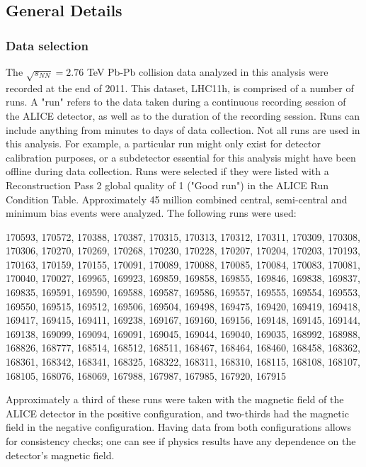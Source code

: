 \subsection{General Details}
\label{sec:GeneralDetails}

\subsubsection{Data selection}
\label{sec:DataSelection}

The $\sqrt{s_{NN}}=2.76$ TeV Pb-Pb collision data analyzed in this analysis were recorded at the end of 2011.
This dataset, LHC11h, is comprised of a number of runs.
A "run" refers to the data taken during a continuous recording session of the ALICE detector, as well as to the duration of the recording session.
Runs can include anything from minutes to days of data collection.
Not all runs are used in this analysis.
For example, a particular run might only exist for detector calibration purposes, or a subdetector essential for this analysis might have been offline during data collection.
Runs were selected if they were listed with a Reconstruction Pass 2 global quality of 1 ("Good run") in the ALICE Run Condition Table. 
Approximately 45 million combined central, semi-central and minimum bias events were analyzed. 
The following runs were used:

170593, 170572, 170388, 170387, 170315, 170313, 170312, 170311, 170309, 170308, 170306, 170270, 170269, 170268, 170230, 170228, 170207, 170204, 170203, 170193, 170163, 170159, 170155, 170091, 170089, 170088, 170085, 170084, 170083, 170081, 170040, 170027, 169965, 169923, 169859, 169858, 169855, 169846, 169838, 169837, 169835, 169591, 169590, 169588, 169587, 169586, 169557, 169555, 169554, 169553, 169550, 169515, 169512, 169506, 169504, 169498, 169475, 169420, 169419, 169418, 169417, 169415, 169411, 169238, 169167, 169160, 169156, 169148, 169145, 169144, 169138, 169099, 169094, 169091, 169045, 169044, 169040, 169035, 168992, 168988, 168826, 168777, 168514, 168512, 168511, 168467, 168464, 168460, 168458, 168362, 168361, 168342, 168341, 168325, 168322, 168311, 168310, 168115, 168108, 168107, 168105, 168076, 168069, 167988, 167987, 167985, 167920, 167915

Approximately a third of these runs were taken with the magnetic field of the ALICE detector in the positive configuration, and two-thirds had the magnetic field in the negative configuration.
Having data from both configurations allows for consistency checks; one can see if physics results have any dependence on the detector's magnetic field.

